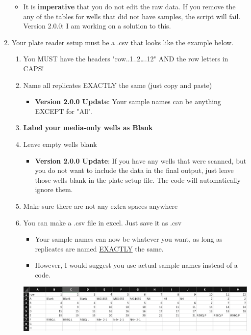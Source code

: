\documentclass[12pt]{article}
\begin{document}
\begin{enumerate}
\begin{itemize}
\item It is \textbf{imperative} that you do not edit the raw data. If you remove the any of the tables for wells that did not have samples, the script will fail. Version 2.0.0: I am working on a solution to this.
\end{itemize}

\item Your plate reader setup must be a .csv that looks like the example
below.

\begin{enumerate}
\item You MUST have the headers "row..1..2\ldots{}.12" AND the row letters in
CAPS!
\item Name all replicates EXACTLY the same (just copy and paste)
\begin{itemize}
\item \textbf{Version 2.0.0 Update}: Your sample names can be anything EXCEPT for "All".
\end{itemize}
\item \textbf{Label your media-only wells as Blank}
\item Leave empty wells blank
\begin{itemize}
\item \textbf{Version 2.0.0 Update}: If you have any wells that were scanned, but you do not want to include the data in the final output, just leave those wells blank in the plate setup file. The code will automatically ignore them.
\end{itemize}
\item Make sure there are not any extra spaces anywhere
\item You can make a .csv file in excel. Just save it as .csv
\begin{itemize}
\item Your sample names can now be whatever you want, as long as replicates are named \uline{EXACTLY} the same.
\item However, I would suggest you use actual sample names instead of a code.
\end{itemize}

\begin{center}
\includegraphics[width=.9\linewidth]{./process_plate_reader_data_image03.png}
\end{center}
\end{enumerate}
\end{enumerate}
\end{document}
